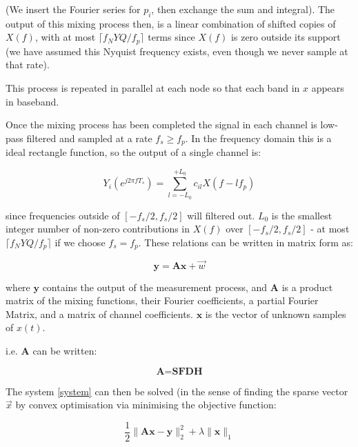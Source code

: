 (We insert the Fourier series for \(p_i\), then exchange the sum and integral). The output of this mixing process then, is a linear combination of shifted copies of \(X\left(f\right)\), with at most \(\lceil f_NYQ/f_p\rceil\) terms since \(X\left(f\right)\) is zero outside its support (we have assumed this Nyquist frequency exists, even though we never sample at that rate).

This process is repeated in parallel at each node so that each band in \(x\) appears in baseband.

Once the mixing process has been completed the signal in each channel is low-pass filtered and sampled at a rate \(f_s \geq f_p\). In the frequency domain this is a ideal rectangle function, so the output of a single channel is:

\begin{equation}
Y_i\left(e^{j 2 \pi f T_s }\right) = \sum_{l = -L_0}^{+L_0} c_{il} X\left(f-lf_p\right)
\end{equation}

since frequencies outside of \([-f_s/2, f_s/2]\) will filtered out. \(L_0\) is the smallest integer number of non-zero contributions in \(X\left(f\right)\) over \([-f_s/2, f_s/2]\) - at most \(\lceil f_NYQ/f_p\rceil\) if we choose \(f_s = f_p\). These relations can be written in matrix form as:

\begin{equation}
\textbf{y} = \textbf{A}\textbf{x} + \vec{w}
\label{system}
\end{equation}

where \(\textbf{y}\) contains the output of the measurement process, and \(\textbf{A}\) is a product matrix of the mixing functions, their Fourier coefficients, a partial Fourier Matrix, and a matrix of channel coefficients. \(\textbf{x}\) is the vector of unknown samples of \(x\left(t\right)\). 

i.e. \(\textbf{A}\) can be written: 

\begin{equation}
\textbf{A} = \textbf{S} \textbf{F} \textbf{D} \textbf{H}
\end{equation}

The system  \ref{system} can then be solved (in the sense of finding the sparse vector \(\vec{x}\) by convex optimisation via minimising the objective function:

\begin{equation}
\frac{1}{2}\|\textbf{Ax}-\textbf{y}\|_2^2 + \lambda \|\textbf{x}\|_1
\end{equation}

